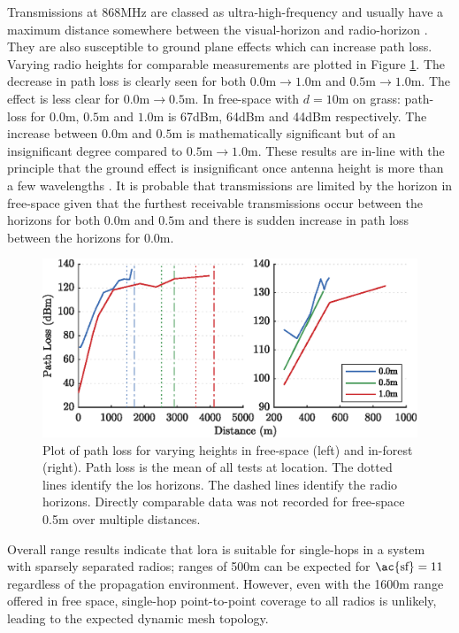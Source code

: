 Transmissions at 868MHz are classed as ultra-high-frequency and usually have a maximum distance somewhere between the visual-horizon and radio-horizon \cite{3YP:ANTENNA_BOOK}. They are also susceptible to ground plane effects which can increase path loss. Varying radio heights for comparable measurements are plotted in Figure \ref{fig:height_pl_plot}. The decrease in path loss is clearly seen for both $0.0\text{m}\rightarrow 1.0\text{m} $ and $0.5\text{m}\rightarrow 1.0\text{m}$. The effect is less clear for $0.0\text{m}\rightarrow 0.5\text{m}$. In free-space with $d=10\text{m}$ on grass: path-loss for $0.0\text{m}$, $0.5\text{m}$ and $1.0\text{m}$ is 67dBm, 64dBm and 44dBm respectively. The increase between $0.0\text{m}$ and $0.5\text{m}$ is mathematically significant but of an insignificant degree compared to $0.5\text{m}\rightarrow 1.0\text{m}$. These results are in-line with the principle that the ground effect is insignificant once antenna height is more than a few wavelengths \cite{3YP:ANTENNA_BOOK}. It is probable that transmissions are limited by the horizon in free-space given that the furthest receivable transmissions occur between the horizons for both $0.0\text{m}$ and $0.5\text{m}$ and there is sudden increase in path loss between the horizons for $0.0\text{m}$.

\begin{figure}[H]
    \centering
   	\includegraphics{Figures/height_pl_plot}
    \caption[Effect of Antenna Height on Path Loss]{
		Plot of path loss for varying heights in free-space (left) and in-forest (right). Path loss is the mean of all tests at location. The dotted lines identify the \ac{los} horizons. The dashed lines identify the radio horizons. Directly comparable data was not recorded for free-space 0.5m over multiple distances.
    }
    \label{fig:height_pl_plot}
\end{figure}

Overall range results indicate that \ac{lora} is suitable for single-hops in a system with sparsely separated radios; ranges of 500m can be expected for $\text{\ac{sf}}=11$ regardless of the propagation environment. However, even with the 1600m range offered in free space, single-hop point-to-point coverage to all radios is unlikely, leading to the expected dynamic mesh topology.

